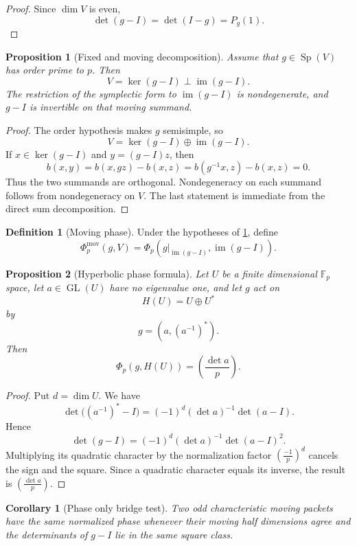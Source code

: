 \documentclass[11pt]{amsart}
\newtheorem{proposition}[proposition]{Proposition}
\newtheorem{corollary}[corollary]{Corollary}
\theoremstyle{definition}
\newtheorem{definition}[definition]{Definition}
\theoremstyle{remark}
\newcommand{\FF}{\mathbb F}
\newcommand{\GL}{\operatorname{GL}}
\newcommand{\Sp}{\operatorname{Sp}}
\newcommand{\im}{\operatorname{im}}
\newcommand{\perpbig}{\mathop{\perp}\limits}
\begin{document}
\begin{proof}
Since \(\dim V\) is even,
\[
\det(g-I)=\det(I-g)=P_g(1).
\]
\end{proof}


\begin{proposition}[Fixed and moving decomposition]\label{prop:fixed_moving}
Assume that \(g\in\Sp(V)\) has order prime to \(p\). Then
\[
V=\ker(g-I)\perpbig\im(g-I).
\]
The restriction of the symplectic form to \(\im(g-I)\) is nondegenerate, and \(g-I\) is invertible on that moving summand.
\end{proposition}

\begin{proof}
The order hypothesis makes \(g\) semisimple, so
\[
V=\ker(g-I)\oplus\im(g-I).
\]
If \(x\in\ker(g-I)\) and \(y=(g-I)z\), then
\[
b(x,y)=b(x,gz)-b(x,z)=b(g^{-1}x,z)-b(x,z)=0.
\]
Thus the two summands are orthogonal. Nondegeneracy on each summand follows from nondegeneracy on \(V\). The last statement is immediate from the direct sum decomposition.
\end{proof}

\begin{definition}[Moving phase]\label{def:moving_phase}
Under the hypotheses of \cref{prop:fixed_moving}, define
\[
\Phi_p^{\mathrm{mov}}(g,V)
=
\Phi_p\left(g|_{\im(g-I)},\im(g-I)\right).
\]
\end{definition}

\begin{proposition}[Hyperbolic phase formula]\label{prop:hyperbolic_phase}
Let \(U\) be a finite dimensional \(\FF_p\) space, let \(a\in\GL(U)\) have no eigenvalue one, and let \(g\) act on
\[
H(U)=U\oplus U^*
\]
by
\[
g=(a,(a^{-1})^*).
\]
Then
\[
\boxed{
\Phi_p(g,H(U))
=
\left(\frac{\det a}{p}\right).
}
\]
\end{proposition}

\begin{proof}
Put \(d=\dim U\). We have
\[
\det\bigl((a^{-1})^*-I\bigr)
=
(-1)^d(\det a)^{-1}\det(a-I).
\]
Hence
\[
\det(g-I)
=
(-1)^d(\det a)^{-1}\det(a-I)^2.
\]
Multiplying its quadratic character by the normalization factor \((\frac{-1}{p})^d\) cancels the sign and the square. Since a quadratic character equals its inverse, the result is \((\frac{\det a}{p})\).
\end{proof}

\begin{corollary}[Phase only bridge test]\label{cor:phase_only_test}
Two odd characteristic moving packets have the same normalized phase whenever their moving half dimensions agree and the determinants of \(g-I\) lie in the same square class.
\end{corollary}
\end{document}
